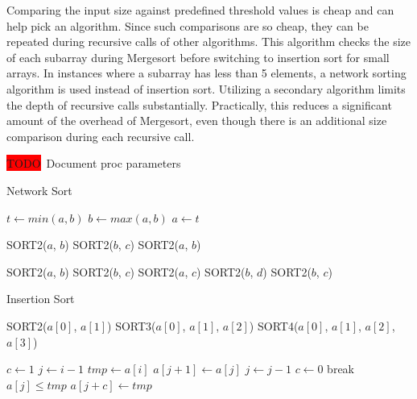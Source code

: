 \documentclass[letter, 12pt, conference]{ieeeconf}
\newcommand{\todo}{\colorbox{red}{TODO}}
\begin{document}
Comparing the input size against predefined threshold values is cheap and can
help pick an algorithm. Since such comparisons are so cheap, they can be
repeated during recursive calls of other algorithms. This algorithm checks the
size of each subarray during Mergesort before switching to insertion sort for
small arrays. In instances where a subarray has less than 5 elements, a network
sorting algorithm is used instead of insertion sort. Utilizing a secondary
algorithm limits the depth of recursive calls substantially. Practically, this
reduces a significant amount of the overhead of Mergesort, even though there is
an additional size comparison during each recursive
call\parencite{the_basic_algorithms}.

\todo\ Document proc parameters

\begin{algorithm}[ht]
	\caption{Network Sort}
	\label{alg:network_sort}
	\begin{algorithmic}
		\State $t \gets min(a, b)$
		\State $b \gets max(a, b)$
		\State $a \gets t$
		\EndProcedure

		\State SORT2($a$, $b$)
		\State SORT2($b$, $c$)
		\State SORT2($a$, $b$)
		\EndProcedure

		\State SORT2($a$, $b$)
		\State SORT2($b$, $c$)
		\State SORT2($a$, $c$)
		\State SORT2($b$, $d$)
		\State SORT2($b$, $c$)
		\EndProcedure
	\end{algorithmic}
\end{algorithm}

\begin{algorithm}[ht]
	\caption{Insertion Sort}
	\label{alg:insertion_sort}
	\begin{algorithmic}
		\Procedure{INS\_SORT}{a, n}
		\If {$n = 2$}
		\State SORT2($a[0]$, $a[1]$)
		\State \Return
		\ElsIf {$n = 3$}
		\State SORT3($a[0]$, $a[1]$, $a[2]$)
		\State \Return
		\ElsIf {$n = 4$}
		\State SORT4($a[0]$, $a[1]$, $a[2]$, $a[3]$)
		\State \Return
		\EndIf

		\For {$i \gets 1$ to $n$}
		\State $c \gets 1$
		\State $j \gets i - 1$
		\If {$a[j] > a[j]$}
		\State $tmp \gets a[i]$
		\Repeat
		\State $a[j + 1] \gets a[j]$
		\State $j \gets j - 1$
		\If {$j = 0$}
		\State $c \gets 0$
		\State break
		\EndIf
		\Until $a[j] \le tmp$
		\State $a[j + c] \gets tmp$
		\EndIf
		\EndFor
		\EndProcedure
	\end{algorithmic}
\end{algorithm}
\end{document}
